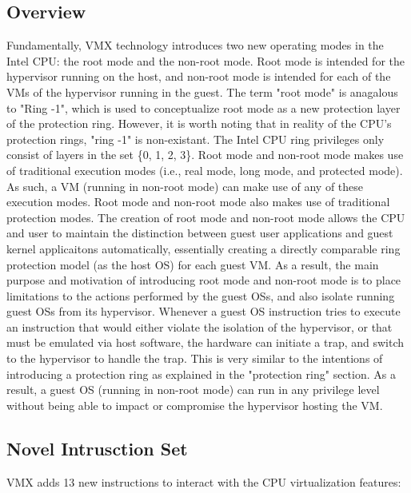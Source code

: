 \documentclass{report}
\begin{document}
\begin{spacing}{1.5}
\subsection{Overview}

{\large
Fundamentally, VMX technology introduces two new operating modes in the Intel CPU: the root mode and the non-root mode. Root mode is intended for the hypervisor running on the host, and non-root mode is intended for each of the VMs of the hypervisor running in the guest. The term "root mode" is anagalous to "Ring -1", which is used to conceptualize root mode as a new protection layer of the protection ring. However, it is worth noting that in reality of the CPU's protection rings, "ring -1" is non-existant. The Intel CPU ring privileges only consist of layers in the set \{0, 1, 2, 3\}. Root mode and non-root mode makes use of traditional execution modes (i.e., real mode, long mode, and protected mode). As such, a VM (running in non-root mode) can make use of any of these execution modes. Root mode and non-root mode also makes use of traditional protection modes. The creation of root mode and non-root mode allows the CPU and user to maintain the distinction between guest user applications and guest kernel applicaitons automatically, essentially creating a directly comparable ring protection model (as the host OS) for each guest VM. As a result, the main purpose and motivation of introducing root mode and non-root mode is to place limitations to the actions performed by the guest OSs, and also isolate running guest OSs from its hypervisor. Whenever a guest OS instruction tries to execute an instruction that would either violate the isolation of the hypervisor, or that must be emulated via host software, the hardware can initiate a trap, and switch to the hypervisor to handle the trap. This is very similar to the intentions of introducing a protection ring as explained in the "protection ring" section. As a result, a guest OS (running in non-root mode) can run in any privilege level without being able to impact or compromise the hypervisor hosting the VM.
\newline
}

\subsection{Novel Intrusction Set}

{\large
VMX adds 13 new instructions to interact with the CPU virtualization features:

}
\end{spacing}
\end{document}
